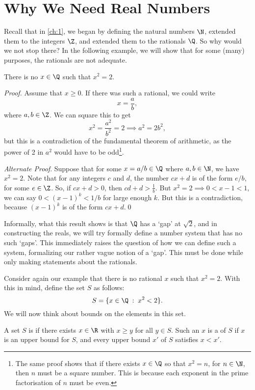 \documentclass[a4paper]{scrreprt}
\begin{document}
\section{Why We Need Real Numbers}

Recall that in \autoref{ch:1}, we began by defining the natural numbers $\N$, extended them to the integers $\Z$, and extended them to the rationals $\Q$. So why would we not stop there? In the following example, we will show that for some (many) purposes, the rationals are not adequate.

\begin{proposition}
	There is no $x \in \Q$ such that $x^2 = 2$.
\end{proposition}
\begin{proof}
	Assume that $x \geq 0$. If there was such a rational, we could write
	$$
	x = \frac{a}{b},
	$$
	where $a, b \in \Z$. We can square this to get
	$$
	x^2 = \frac{a^2}{b^2} = 2 \implies a^2 = 2b^2,
	$$
	but this is a contradiction of the fundamental theorem of arithmetic, as the power of 2 in $a^2$ would have to be odd\footnote{The same proof shows that if there exists $x \in \Q$ so that $x^2 = n$, for $n \in \N$, then $n$ must be a square number. This is because each exponent in the prime factorisation of $n$ must be even.}.\hfill\qedhere

	\emph{Alternate Proof}. Suppose that for some $x = a/b \in \Q$ where $a, b \in \N$, we have $x^2 = 2$. Note that for any integers $c$ and $d$, the number $cx + d$ is of the form $e/b$, for some $e \in \Z$. So, if $cx + d > 0$, then $cd + d > \frac{1}{b}$. But $x^2 = 2 \implies 0 < x - 1 < 1$, we can say $0 < (x - 1)^k < 1/b$ for large enough $k$. But this is a contradiction, because $(x - 1)^k$ is of the form $cx + d$.\hfill\qed
\end{proof}

Informally, what this result shows is that $\Q$ has a `gap' at $\sqrt{2}$, and in constructing the reals, we will try formally define a number system that has no such `gaps'. This immediately raises the question of how we can define such a system, formalizing our rather vague notion of a `gap'. This must be done while only making statements about the rationals.  


Consider again our example that there is no rational $x$ such that $x^2 = 2$. With this in mind, define the set $S$ as follows:
$$
S = \{ x \in \Q \; : \; x^2 < 2\}.
$$
We will now think about bounds on the elements in this set.

\begin{definition}
	A set $S$ is  if there exists $x \in \R$ with $x \geq y$ for all $y \in S$. Such an $x$ is a  of $S$ if $x$ is an upper bound for $S$, and every upper bound $x'$ of $S$ satisfies $x < x'$. 
\end{definition}
\end{document}

